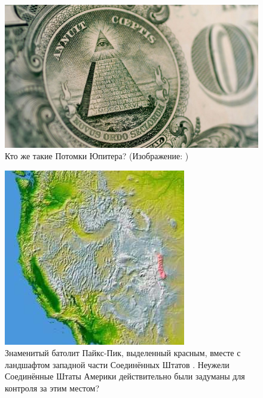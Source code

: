 \documentclass[10pt,twocolumn,letterpaper]{article}
\begin{document}
\begin{figure}[t]
\begin{center}
\includegraphics[width=1\linewidth]{illuminati.jpg}
\end{center}
   \caption{Кто же такие Потомки Юпитера? (Изображение: \cite{35})}
\label{fig:10}
\label{fig:onecol}
\end{figure}

\begin{figure}[t]
\begin{center}
   \includegraphics[width=1\linewidth]{pike.jpg}
\end{center}
   \caption{Знаменитый батолит Пайкс-Пик, выделенный красным, вместе с ландшафтом западной части Соединённых Штатов \cite{36}. Неужели Соединённые Штаты Америки действительно были задуманы для контроля за этим местом?}
\label{fig:11}
\label{fig:onecol}
\end{figure}
\end{document}
